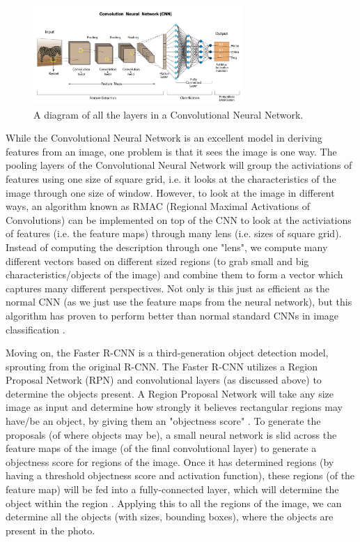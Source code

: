 \documentclass[10pt,twocolumn]{article}
\begin{document}
\begin{figure}[h]
  \includegraphics[width=8cm]{cnnlayer.jpg}
  \caption{A diagram of all the layers in a Convolutional Neural Network. \cite{Swapna2020}}
  \centering
\end{figure}

While the Convolutional Neural Network is an excellent model in deriving features from an image, one problem is that it sees the image is one way. The pooling layers of the Convolutional Neural Network will group the activiations of features using one size of square grid, i.e. it looks at the characteristics of the image through one size of window. However, to look at the image in different ways, an algorithm known as RMAC (Regional Maximal Activations of Convolutions) can be implemented on top of the CNN to look at the activiations of features (i.e. the feature maps) through many lens (i.e. sizes of square grid). Instead of computing the description through one "lens", we compute many different vectors based on different sized regions (to grab small and big characteristics/objects of the image) and combine them to form a vector which captures many different perspectives. Not only is this just as efficient as the normal CNN (as we just use the feature maps from the neural network), but this algorithm has proven to perform better than normal standard CNNs in image classification \cite{Tolias2016}.

Moving on, the Faster R-CNN is a third-generation object detection model, sprouting from the original R-CNN. The Faster R-CNN utilizes a Region Proposal Network (RPN) and convolutional layers (as discussed above) to determine the objects present. A Region Proposal Network will take any size image as input and determine how strongly it believes rectangular regions may have/be an object, by giving them an "objectness score" \cite{Ren2016}. To generate the proposals (of where objects may be), a small neural network is slid across the feature maps of the image (of the final convolutional layer) to generate a objectness score for regions of the image. Once it has determined regions (by having a threshold objectness score and activation function), these regions (of the feature map) will be fed into a fully-connected layer, which will determine the object within the region \cite{Ren2016}. Applying this to all the regions of the image, we can determine all the objects (with sizes, bounding boxes), where the objects are present in the photo.
\end{document}
